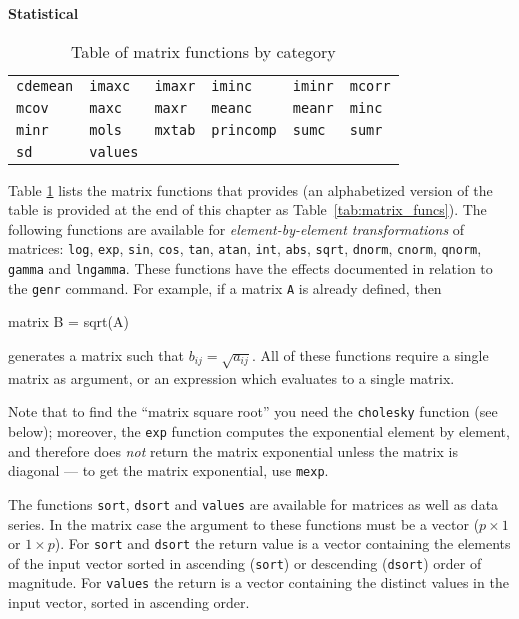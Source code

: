 \begin{table}[htbp]
\textbf{Statistical}
\hrulefill

\begin{tabular}{p{\cwid}p{\cwid}p{\cwid}p{\cwid}p{\cwid}p{\cwid}}
\texttt{cdemean}   &
\texttt{imaxc}     &
\texttt{imaxr}     &
\texttt{iminc}     &
\texttt{iminr}     &
\texttt{mcorr}     \\
\texttt{mcov}      &
\texttt{maxc}      &   
\texttt{maxr}      &
\texttt{meanc}     &
\texttt{meanr}     &
\texttt{minc}      \\   
\texttt{minr}      &
\texttt{mols}      &
\texttt{mxtab}     &
\texttt{princomp}  &
\texttt{sumc}      &
\texttt{sumr}      \\
\texttt{sd}        &
\texttt{values}  
\end{tabular}      

\caption{Table of matrix functions by category}
\label{tab:matrix_funcs_cat}
\end{table}

Table \ref{tab:matrix_funcs_cat} lists the matrix functions that
 provides (an alphabetized version of the table is
provided at the end of this chapter as Table~\ref{tab:matrix_funcs}).
The following functions are available for \textit{element-by-element
  transformations} of matrices: \texttt{log}, \texttt{exp},
\texttt{sin}, \texttt{cos}, \texttt{tan}, \texttt{atan}, \texttt{int},
\texttt{abs}, \texttt{sqrt}, \texttt{dnorm}, \texttt{cnorm},
\texttt{qnorm}, \texttt{gamma} and \texttt{lngamma}.  These functions
have the effects documented in relation to the \texttt{genr} command.
For example, if a matrix \texttt{A} is already defined, then
%
\begin{code}
matrix B = sqrt(A)
\end{code}
%
generates a matrix such that $b_{ij} = \sqrt{a_{ij}}$.  All of these
functions require a single matrix as argument, or an expression which
evaluates to a single matrix.

Note that to find the ``matrix square root'' you need the
\texttt{cholesky} function (see below); moreover, the \texttt{exp}
function computes the exponential element by element, and therefore
does \emph{not} return the matrix exponential unless the matrix is
diagonal --- to get the matrix exponential, use \texttt{mexp}.
  
The functions \texttt{sort}, \texttt{dsort} and \texttt{values}
are available for matrices as well as data series.  In the matrix case
the argument to these functions must be a vector ($p \times 1$ or
$1\times p$).  For \texttt{sort} and \texttt{dsort} the return value
is a vector containing the elements of the input vector sorted in
ascending (\texttt{sort}) or descending (\texttt{dsort}) order of
magnitude.  For \texttt{values} the return is a vector containing the
distinct values in the input vector, sorted in ascending order.


